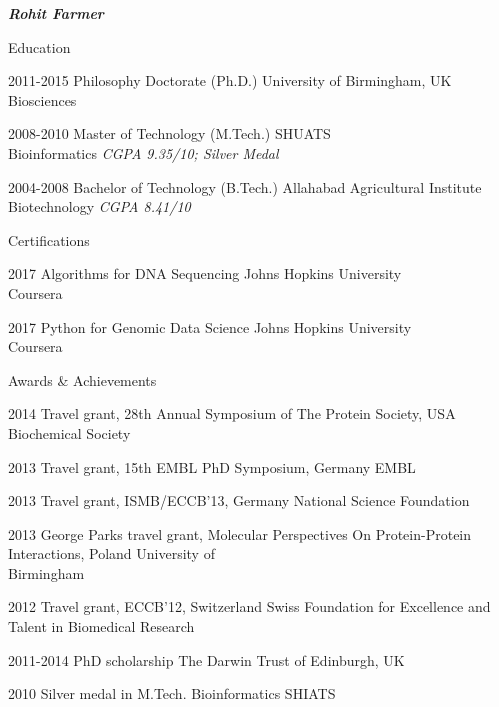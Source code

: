 \documentclass[10pt]{article}
\begin{document}
\begin{cv}{\huge \it \bfseries Rohit Farmer}
\begin{cvlist}{Education}
	\item[2011-2015] Philosophy Doctorate (Ph.D.) \hfill University of Birmingham, UK \\ Biosciences
	\item[2008-2010] Master of Technology (M.Tech.) \hfill SHUATS  \\ Bioinformatics \emph{CGPA 9.35/10; Silver Medal}
	\item[2004-2008] Bachelor of Technology (B.Tech.) \hfill Allahabad Agricultural Institute  \\ Biotechnology \emph{CGPA 8.41/10}
\end{cvlist}

\begin{cvlist}{Certifications}
	\item[2017] Algorithms for DNA Sequencing \hfill Johns Hopkins University  \\ \hspace*{\fill} Coursera
	\item[2017] Python for Genomic Data Science \hfill Johns Hopkins University  \\ \hspace*{\fill} Coursera
\end{cvlist}

\begin{cvlist}{Awards \& Achievements}
	\item[2014] Travel grant, 28th Annual Symposium of The Protein Society, USA \hfill Biochemical Society
	\item[2013] Travel grant, 15th EMBL PhD Symposium, Germany \hfill EMBL
	\item[2013] Travel grant, ISMB/ECCB'13, Germany \hfill National Science Foundation
	\item[2013] George Parks travel grant,  Molecular Perspectives On Protein-Protein Interactions, Poland \hfill University of \\ \hspace*{\fill} Birmingham
	\item[2012] Travel grant, ECCB’12, Switzerland \hfill Swiss Foundation for Excellence and \\ \hspace*{\fill} Talent in Biomedical Research
	\item[2011-2014] PhD scholarship \hfill The Darwin Trust of Edinburgh, UK
	\item[2010] Silver medal in M.Tech. Bioinformatics \hfill SHIATS
\end{cvlist}


\end{cv}
\end{document}
